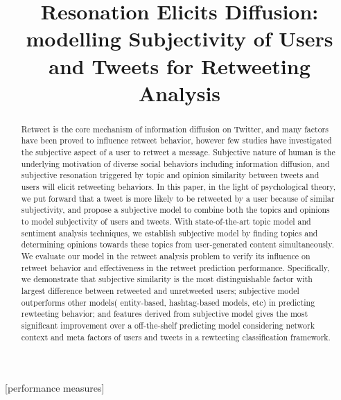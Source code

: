 \documentclass{acm_proc_article-sp}
\newcommand{\mo}[1]{\textcolor{red}{#1}}
\begin{document}
\title{Resonation Elicits Diffusion: modelling Subjectivity of Users and Tweets for Retweeting Analysis}

\maketitle
\begin{abstract}
Retweet is the core mechanism of information diffusion on Twitter, and many factors have been proved to influence retweet behavior, however few studies have investigated the subjective aspect of a user to retweet a message. 
Subjective nature of human is the underlying motivation of diverse social behaviors including information diffusion, and subjective resonation triggered by topic and opinion similarity between tweets and users will elicit retweeting behaviors.
In this paper, in the light of psychological theory, we put forward that a tweet is more likely to be retweeted by a user because of similar subjectivity, and propose a subjective model to combine both the topics and opinions to model subjectivity of users and tweets. 
With state-of-the-art topic model and sentiment analysis techniques, we establish subjective model by finding topics and determining opinions towards these topics from user-generated content simultaneously.
We evaluate our model in the retweet analysis problem to verify its influence on retweet behavior and effectiveness in the retweet prediction performance. 
Specifically, we demonstrate that subjective similarity is the most distinguishable factor with largest difference between retweeted and unretweeted users;
subjective model outperforms other models( entity-based, hashtag-based models, etc) in predicting rewteeting behavior; 
and features derived from subjective model gives the most significant improvement over a off-the-shelf predicting model considering network context and meta factors of users and tweets in a rewteeting classification framework.
\end{abstract}
[performance measures]
\end{document}
